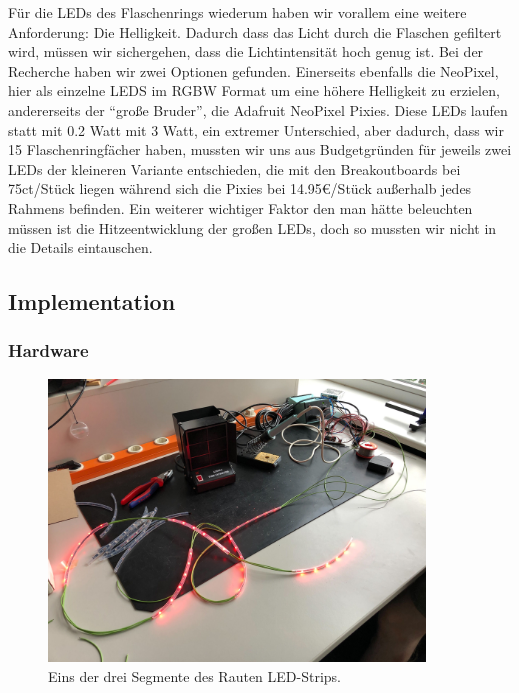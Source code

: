         Für die LEDs des Flaschenrings wiederum haben wir vorallem eine weitere Anforderung: Die Helligkeit. Dadurch dass das Licht durch die Flaschen gefiltert wird, müssen wir sichergehen, dass die Lichtintensität hoch genug ist. Bei der Recherche haben wir zwei Optionen gefunden.
        Einerseits ebenfalls die NeoPixel, hier als einzelne LEDS im RGBW Format um eine höhere Helligkeit zu erzielen, andererseits der \enquote{große Bruder}, die Adafruit NeoPixel Pixies. Diese LEDs laufen statt mit 0.2 Watt mit 3 Watt, ein extremer Unterschied, aber dadurch, dass wir 15 Flaschenringfächer haben, mussten wir uns aus Budgetgründen für jeweils zwei LEDs der kleineren Variante entschieden, die mit den Breakoutboards bei 75ct/Stück liegen während sich die Pixies bei 14.95€/Stück außerhalb jedes Rahmens befinden. Ein weiterer wichtiger Faktor den man hätte beleuchten müssen ist die Hitzeentwicklung der großen LEDs, doch so mussten wir nicht in die Details eintauschen.


    \subsection{Implementation}

        \subsubsection{Hardware}

            \begin{figure}[H]
                \begin{center}
                    \includegraphics[width=10cm]{media/03_technical_implementation/picture_led_strip.jpg}
                \end{center}
                \caption{Eins der drei Segmente des Rauten LED-Strips.}
                \label{fig:picture_led_strip}
            \end{figure}

